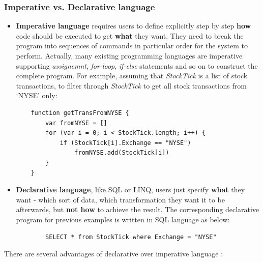 \subsubsection*{Imperative vs. Declarative language}
\begin{itemize}
	\item \textbf{Imperative language} requires users to define explicitly step by step \textbf{how} code should be executed to get \textbf{what} they want. They need to break the program into sequences of commands in particular order for the system to perform. Actually, many existing programming languages are imperative supporting \textit{assignemnt}, \textit{for-loop}, \textit{if-else} statements and so on to construct the complete program. For example, assuming that \textit{StockTick} is a  list of stock transactions,  to filter through \textit{StockTick} to get all stock transactions from `NYSE' only: 
\begin{lstlisting}
	function getTransFromNYSE {
		var fromNYSE = []
		for (var i = 0; i < StockTick.length; i++) {
			if (StockTick[i].Exchange == "NYSE")
				fromNYSE.add(StockTick[i])
		}
	}
\end{lstlisting}
	\item \textbf{Declarative language}, like SQL or LINQ, users just specify \textbf{what} they want - which sort of data, which transformation they want it to be afterwards, but \textbf{not how} to achieve the result. The corresponding declarative program for previous examples is written in SQL language as below:
	\begin{verbatim}
		SELECT * from StockTick where Exchange = "NYSE"
	\end{verbatim}
\end{itemize}

There are several advantages of declarative over imperative language \citep{Martin:2014}:

